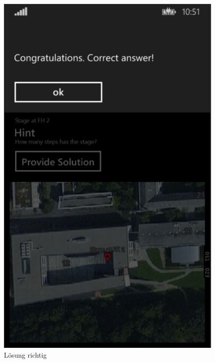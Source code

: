 \documentclass[a4paper,ngerman]{scrartcl}
\begin{document}
\begin{figure}[h]
\centering
\includegraphics[width=.95\textwidth]{images/routeSolutionPage_Success}
\caption{Lösung richtig}
\end{figure}
\end{document}
